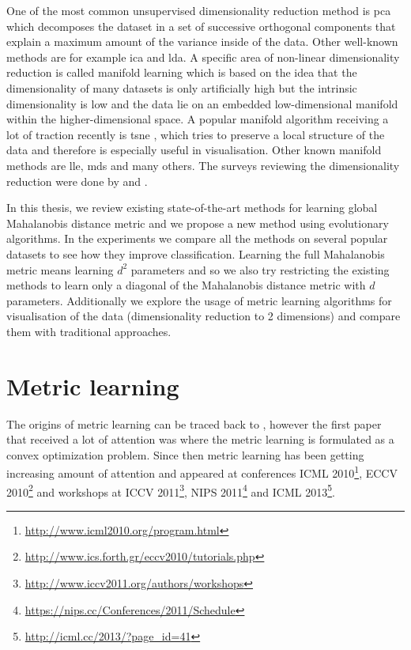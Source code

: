 \documentclass[12pt,a4paper]{report}
\begin{document}
One of the most common unsupervised dimensionality reduction method is \ac{pca} \citep{jolliffe2002principal} which decomposes the dataset in a set of successive orthogonal components that explain a maximum amount of the variance inside of the data. Other well-known methods are for example \ac{ica} and \ac{lda}. A specific area of non-linear dimensionality reduction is called manifold learning which is based on the idea that the dimensionality of many datasets is only artificially high but the intrinsic dimensionality is low and the data lie on an embedded low-dimensional manifold within the higher-dimensional space. A popular manifold algorithm receiving a lot of traction recently is \ac{tsne} \citep{maaten2008visualizing}, which tries to preserve a local structure of the data and therefore is especially useful in visualisation. Other known manifold methods are \ac{lle}, \ac{mds} and many others. The surveys reviewing the dimensionality reduction were done by \citep{fodor2002survey} and \citep{van2009dimensionality}.

In this thesis, we review existing state-of-the-art methods for learning global Mahalanobis distance metric and we propose a new method using evolutionary algorithms. In the experiments we compare all the methods on several popular datasets to see how they improve classification. Learning the full Mahalanobis metric means learning $d^2$ parameters and so we also try restricting the existing methods to learn only a diagonal of the Mahalanobis distance metric with $d$ parameters. Additionally we explore the usage of metric learning algorithms for visualisation of the data (dimensionality reduction to 2 dimensions) and compare them with traditional approaches.

\section{Metric learning} \label{chap:intro:ml}

The origins of metric learning can be traced back to \citep{short1981optimal}, however the first paper that received a lot of attention was \citep{xing2002distance} where the metric learning is formulated as a convex optimization problem. Since then metric learning has been getting increasing amount of attention and appeared at conferences ICML 2010\footnote{\url{http://www.icml2010.org/program.html}}, ECCV 2010\footnote{\url{http://www.ics.forth.gr/eccv2010/tutorials.php}} and workshops at ICCV 2011\footnote{\url{http://www.iccv2011.org/authors/workshops}}, NIPS 2011\footnote{\url{https://nips.cc/Conferences/2011/Schedule}} and ICML 2013\footnote{\url{http://icml.cc/2013/?page_id=41}}.
\end{document}
